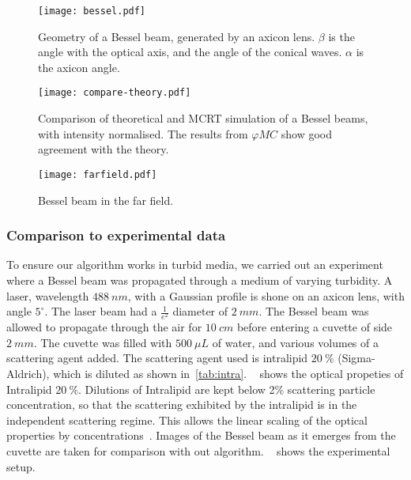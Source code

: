 \begin{figure}[!ht]
    \centering
    \texttt{[image: bessel.pdf]}
    \caption{Geometry of a Bessel beam, generated by an axicon lens. $\beta$ is the angle with the optical axis, and the angle of the conical waves. $\alpha$ is the axicon angle.}
    \label{fig:besselgeo}
\end{figure}




\begin{figure}[!ht]
    \centering
    \texttt{[image: compare-theory.pdf]}
    \caption{Comparison of theoretical and MCRT simulation of a Bessel beams, with intensity normalised. The results from $\varphi MC$ show good agreement with the theory.}
    \label{fig:besselCompare}
\end{figure}

\begin{figure}
\centering
\texttt{[image: farfield.pdf]}
\caption{Bessel beam in the far field.}
\label{fig:farfield}
\end{figure}

\FloatBarrier

\subsubsection*{Comparison to experimental data}

To ensure our algorithm works in turbid media, we carried out an experiment where a Bessel beam was propagated through a medium of varying turbidity.
A laser, wavelength $488~nm$, with a Gaussian profile is shone on an axicon lens, with angle $5^{\circ}$.
The laser beam had a $\tfrac{1}{e^2}$ diameter of $2~mm$. 
The Bessel beam was allowed to propagate through the air for $10~cm$ before entering a cuvette of side $2~mm$.
The cuvette was filled with $500~\mu L$ of water, and various volumes of a scattering agent added.
The scattering agent used is intralipid $20~\%$ (Sigma-Aldrich), which is diluted as shown in~\cref{tab:intra}.
~ shows the optical propeties of Intralipid $20~\%$.
Dilutions of Intralipid are kept below 2\% scattering particle concentration, so that the scattering exhibited by the intralipid is in the independent scattering regime.
This allows the linear scaling of the optical properties by concentrations~\cite{aernouts2013supercontinuum,vardaki2015studying,di2011effect}.
Images of the Bessel beam as it emerges from the cuvette are taken for comparison with out algorithm.
~ shows the experimental setup.

